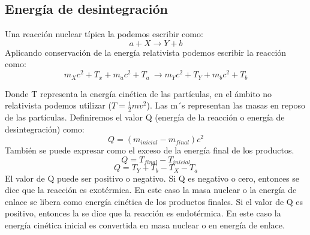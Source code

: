 \subsection{Energía de desintegración}
Una reacción nuclear típica la podemos escribir como:
\begin{equation*}
  a + X \longrightarrow Y + b  
\end{equation*}
Aplicando conservación de la energía relativista podemos escribir la reacción como:
\begin{equation}
    m_Xc^2+T_x+m_ac^2+T_a\ \longrightarrow m_Yc^2+T_Y+m_bc^2+T_b
\end{equation}

Donde T representa la energía cinética de las partículas, en el ámbito no relativista podemos utilizar ($T=\frac{1}{2}mv^2$). Las m´s representan las masas en reposo de las partículas. Definiremos el valor Q (energía de la reacción o energía de desintegración) como:
\begin{equation}
    Q=(m_{inicial}-m_{final})c^2   
\end{equation}
También se puede expresar como el exceso de la energía final de los productos.
\begin{equation}
   Q=T_{final}-T_{inicial}
\end{equation} 
\begin{equation}
   Q=T_Y+T_b-T_X-T_a
\end{equation}
El valor de Q puede ser positivo o negativo. Si Q es negativo o cero, entonces se dice que la reacción es exotérmica. En este caso la masa nuclear o la energía de enlace se libera como energía cinética de los productos finales. Si el valor de Q es positivo, entonces la se dice que la reacción es endotérmica. En este caso la energía cinética inicial es convertida en masa nuclear o en energía de enlace. \cite{Krane.1987}
